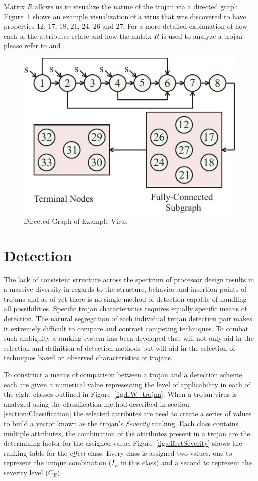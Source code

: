 Matrix $R$ allows us to visualize the nature of the trojan via a directed graph. Figure~\ref{fig:Full1} shows an example visualization of a virus that was discovered to have properties $12$, $17$, $18$, $21$, $24$, $26$ and $27$. For a more detailed explanation of how each of the attributes relate and how the matrix $R$ is used to analyze a trojan please refer to \cite{SamerDissertation} and \cite{SamerClassification}.
\begin{figure}[h]
	\centering
	\includegraphics[width=0.55\linewidth]{figures/Full1}
	\caption[Directed Graph of Example Virus]{Directed Graph of Example Virus}
	\label{fig:Full1}
\end{figure}

\section{Detection} \label{section:Detection}
The lack of consistent structure across the spectrum of processor design results in a massive diversity in regards to the structure, behavior and insertion points of trojans and as of yet there is no single method of detection capable of handling all possibilities. Specific trojan characteristics requires equally specific means of detection. The natural segregation of each individual trojan detection pair makes it extremely difficult to compare and contrast competing techniques. To combat such ambiguity a ranking system has been developed that will not only aid in the selection and definition of detection methods but will aid in the selection of techniques based on observed characteristics of trojans.\newline

To construct a means of comparison between a trojan and a detection scheme each are given a numerical value representing the level of applicability in each of the eight classes outlined in Figure~\ref{fig:HW_trojan}. When a trojan virus is analyzed using the classification method described in section \ref{section:Classification} the selected attributes are used to create a series of values to build a vector known as the trojan's \textit{Severity} ranking. Each class contains multiple attributes, the combination of the attributes present in a trojan are the determining factor for the assigned value. Figure~\ref{fig:effectSeverity} shows the ranking table for the \textit{effect} class. Every class is assigned two values, one to represent the unique combination ($I_E$ in this class) and a second to represent the severity level ($C_E$). \newline

